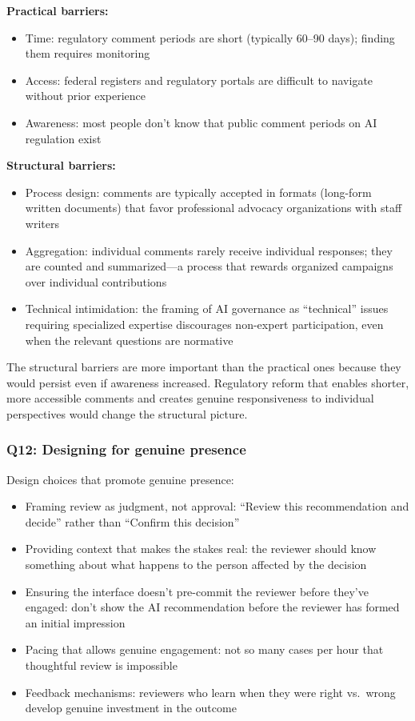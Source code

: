 \textbf{Practical barriers:}
\begin{itemize}
    \item Time: regulatory comment periods are short (typically 60--90 days); finding them requires monitoring
    \item Access: federal registers and regulatory portals are difficult to navigate without prior experience
    \item Awareness: most people don't know that public comment periods on AI regulation exist
\end{itemize}

\textbf{Structural barriers:}
\begin{itemize}
    \item Process design: comments are typically accepted in formats (long-form written documents) that favor professional advocacy organizations with staff writers
    \item Aggregation: individual comments rarely receive individual responses; they are counted and summarized---a process that rewards organized campaigns over individual contributions
    \item Technical intimidation: the framing of AI governance as ``technical'' issues requiring specialized expertise discourages non-expert participation, even when the relevant questions are normative
\end{itemize}

The structural barriers are more important than the practical ones because they would persist even if awareness increased. Regulatory reform that enables shorter, more accessible comments and creates genuine responsiveness to individual perspectives would change the structural picture.

\subsubsection*{Q12: Designing for genuine presence}

Design choices that promote genuine presence:

\begin{itemize}
    \item Framing review as judgment, not approval: ``Review this recommendation and decide'' rather than ``Confirm this decision''
    \item Providing context that makes the stakes real: the reviewer should know something about what happens to the person affected by the decision
    \item Ensuring the interface doesn't pre-commit the reviewer before they've engaged: don't show the AI recommendation before the reviewer has formed an initial impression
    \item Pacing that allows genuine engagement: not so many cases per hour that thoughtful review is impossible
    \item Feedback mechanisms: reviewers who learn when they were right vs.\ wrong develop genuine investment in the outcome
\end{itemize}

